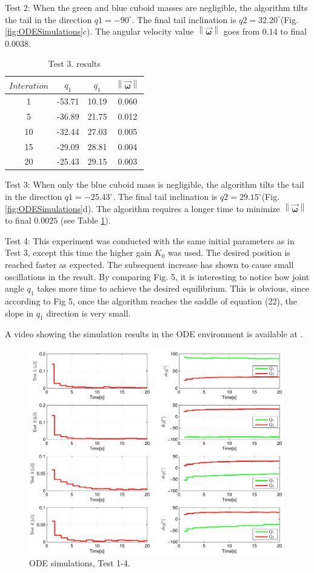 Test 2: When the green and blue cuboid masses are negligible, the algorithm tilts the tail in the direction $q1=-90^{\circ}$. The final tail inclination is $q2=32.20^{\circ}$(Fig. \ref{fig:ODESimulations}c). The angular velocity value $\left \| \vec{\boldsymbol{\omega}} \right \|$ goes from $0.14$ to final $0.0038$. 

\begin{table}[!t]
	\centering
\begin{tabular}{|c|c|c|c|}
	\hline
$Interation$ & $q_1$ & $q_1$  & $\left \| \vec{\boldsymbol{\omega}} \right \|$\\
	\hline
1 & -53.71 & 10.19 & 0.060\\
5 & -36.89 & 21.75 & 0.012\\
10 & -32.44 & 27.03 &  0.005\\
15 & -29.09 & 28.81 & 0.004\\
20 & -25.43 & 29.15 &  0.003\\
\hline
\end{tabular}
\caption{Test 3. results}\label{tab:Simulations2}
\end{table}

Test 3: When only the blue cuboid mass is negligible, the algorithm tilts the tail in the direction $q1=-25.43^{\circ}$. The final tail inclination is $q2=29.15^{\circ}$(Fig. \ref{fig:ODESimulations}d). The algorithm requires a longer time to minimize $\left \| \vec{\boldsymbol{\omega}} \right \|$ to final $0.0025$ (see Table \ref{tab:Simulations2}).



Test 4: This experiment was conducted with the same initial parameters as in Test 3, except this time the higher gain $K_0$ was used. The desired position is reached faster as expected. The subsequent increase has shown to cause small oscillations in the result. By comparing Fig. 5, it is interesting to notice how joint angle $q_1$ takes more time to achieve the desired equilibrium. This is obvious, since according to Fig 5, once the algorithm reaches the saddle of equation (22), the slope in $q_1$ direction is very small.

A video showing the simulation results in the ODE environment is available at \cite{IROS2013Movie}.


\begin{figure}[!t]
	\centering
	\includegraphics[width=111mm]{./pictures/ODE_graph.pdf}
	\caption{ODE simulations, Test 1-4.}
	\label{fig:ODE graph}
\end{figure}


